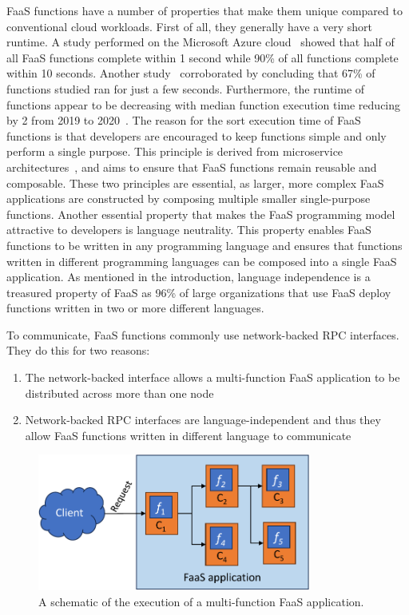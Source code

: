 \documentclass[../main.tex]{subfiles}
\begin{document}
\begin{refsection}
FaaS functions have a number of properties that make them unique
compared to conventional cloud workloads. First of all, they generally
have a very short runtime. A study performed on the Microsoft Azure
cloud~\cite{shahrad20_server_wild} showed that half of all FaaS
functions complete within 1 second while 90\% of all functions
complete within 10 seconds. Another
study~\cite{eismann20_review_server_use_cases_their_charac}
corroborated by concluding that 67\% of functions studied ran for just
a few seconds.  Furthermore, the runtime of functions appear to be
decreasing with median function execution time reducing by
2\texttimes{} from 2019 to 2020~\cite{serverless_state_21}. The reason
for the sort execution time of FaaS functions is that developers are
encouraged to keep functions simple and only perform a single
purpose. This principle is derived from microservice
architectures~\cite{gan19_open_sourc_bench_suite_micros}, and aims to
ensure that FaaS functions remain reusable and composable. These two
principles are essential, as larger, more complex FaaS applications
are constructed by composing multiple smaller single-purpose
functions. Another essential property that makes the FaaS programming
model attractive to developers is language neutrality. This property
enables FaaS functions to be written in any programming language and
ensures that functions written in different programming languages can
be composed into a single FaaS application. As mentioned in the
introduction, language independence is a treasured property of FaaS as
96\% of large organizations that use FaaS deploy functions written in
two or more different languages\cite{serverless_state}.

To communicate, FaaS functions commonly use network-backed RPC interfaces. They do this for two reasons:

\begin{enumerate}
\item The network-backed interface allows a multi-function FaaS application to be distributed across more than one node
\item Network-backed RPC interfaces are language-independent and thus they allow FaaS functions written in different language to communicate
\end{enumerate}

\begin{figure}[ht]
  \centering
\includegraphics[width=0.8\textwidth]{papers/paper5-cofaas/figures/faas_application.pdf}
\caption{\label{fig:faas-app} A schematic of the execution of a multi-function FaaS application.}
\end{figure}


\end{refsection}
\end{document}
